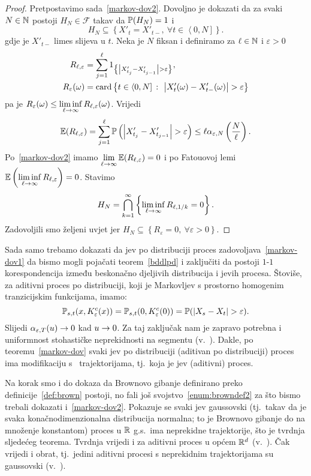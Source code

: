 \documentclass[main.tex]{subfiles}
\begin{document}
\begin{proof}
	Pretpostavimo sada~\eqref{markov-dov2}. Dovoljno je dokazati da za svaki \( N \in \N \)
	postoji \( H_N \in \mathcal F \) takav da \( \P(H_N)=1 \) i
	\[
		H_N \subseteq \left\{ X'_t = X'_{t-}, \ \forall t \in \left\langle 0,N \right] \right\}.
	\]
	gdje je \( X'_{t-} \) limes slijeva u \( t \). Neka je \( N \) fiksan i definiramo za \( \ell \in \N \) i \( \varepsilon > 0 \)
	\begin{align}
		R_{\ell, \varepsilon}   & = \sum_{j=1}^\ell 1_{\left\{ \abs{X'_{t_j}-X'_{t_{j-1}}} > \varepsilon \right\}},                           \\
		R_{\varepsilon}(\omega) & = \card \left\{ t \in \left\langle0, N\right] \st \abs{X'_t(\omega)-X'_{t-}(\omega)} > \varepsilon \right\}
	\end{align}
	pa je \( R_\varepsilon(\omega) \le \liminf\limits_{\ell \ub} R_{\ell, \varepsilon}(\omega) \). Vrijedi
	\begin{equation}
		\E(R_{\ell, \varepsilon}) =
		\sum_{j=1}^\ell \P\left(\abs{X'_{t_j} - X'_{t_{j-1}}} > \varepsilon\right) \le \ell \alpha_{\varepsilon, N}\left( \frac N\ell \right).
	\end{equation}
	Po~\eqref{markov-dov2} imamo \( \lim\limits_{\ell \ub} \E(R_{\ell, \varepsilon}) = 0 \) i po Fatouovoj lemi \( \E\left(\liminf\limits_{\ell \ub} R_{\ell, \varepsilon}\right) = 0 \). Stavimo
	\[
		H_N = \bigcap_{k=1}^\infty \left\{ \liminf\limits_{\ell \ub} R_{\ell, 1/k} = 0 \right\}.
	\]
	Zadovoljili smo željeni uvjet jer \( H_N \subseteq \left\{ R_\varepsilon = 0, \ \forall \varepsilon > 0 \right\} \).
\end{proof}
\bigskip
Sada samo trebamo dokazati da \levy jev po distribuciji proces zadovoljava~\eqref{markov-dov1} da
bismo mogli pojačati teorem~\ref{bddlpd} i zaključiti da postoji \( 1 \)-\( 1 \)
korespondencija između beskonačno djeljivih distribucija i \levy jevih procesa. Štoviše, za aditivni
proces po distribuciji, koji je Markovljev s prostorno homogenim tranzicijskim funkcijama, imamo:
\[
	\Ptrans_{s, t}(x, K_\varepsilon^c(x)) = \Ptrans_{s, t}(0, K_\varepsilon^c(0)) = \P(\abs{X_s-X_t} > \varepsilon).
\]
Slijedi \( \alpha_{\varepsilon, T}(u) \un \) kad \( u \un \). Za taj zaključak nam je zapravo
potrebna i uniformnost stohastičke neprekidnosti na segmentu (v.~\cite[lema~9.6]{sato}). Dakle, po
teoremu~\ref{markov-dov} svaki \levy jev po distribuciji (aditivan po distribuciji)
proces ima modifikaciju s \cadlag \ trajektorijama, tj.\ koja je \levy jev (aditivni) proces.

Na korak smo i do dokaza da Brownovo gibanje definirano preko definicije~\ref{def:brown} postoji, no fali još svojstvo~\ref{enum:browndef2} za što bismo trebali dokazati
i~\eqref{markov-dov2}. Pokazuje se svaki \levy jev gaussovski (tj.\ takav da
je svaka konačnodimenzionalna distribucija normalna; to je Brownovo gibanje do na množenje konstantom) proces u \( \R \) g.s.\ ima neprekidne trajektorije,
što je tvrdnja sljedećeg teorema. Tvrdnja vrijedi i za aditivni proces u općem \( \R^d \) (v.~\cite[tm.~11.7]{sato}). Čak vrijedi i obrat, tj.\ jedini aditivni procesi s neprekidnim trajektorijama su gaussovski (v.~\cite[]{sato}).
\end{document}
